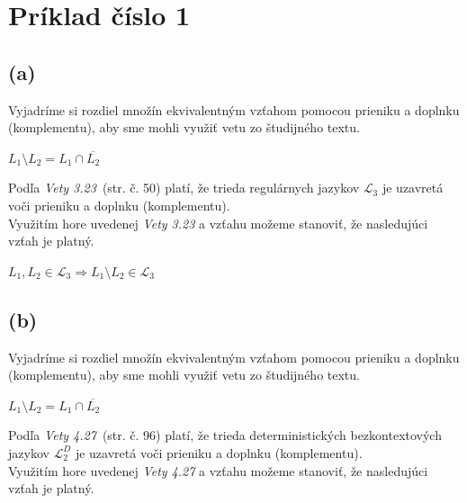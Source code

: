 \documentclass[11pt,a4paper]{article}
\begin{document}
\newpage

\section{Príklad číslo 1} %

\subsection{(a)} %

Vyjadríme si rozdiel množín ekvivalentným vzťahom pomocou prieniku a doplnku (komplementu), aby sme mohli využiť vetu zo študijného textu.
\begin{center}
$L_1 \setminus L_2 = L_1 \cap \overline{L_2}$
\end{center}

Podľa \textit{Vety 3.23}~\cite{TIN}(str. č. 50) platí, že trieda regulárnych jazykov $\mathcal{L}_3$ je uzavretá voči prieniku a doplnku (komplementu).\\

Využitím hore uvedenej \textit{Vety 3.23} a vzťahu možeme stanoviť, že nasledujúci vzťah je platný.

\begin{center}
$L_1,L_2 \in \mathcal{L}_3 \Rightarrow L_1 \setminus L_2 \in \mathcal{L}_3$
\end{center}

\subsection{(b)} %

Vyjadríme si rozdiel množín ekvivalentným vzťahom pomocou prieniku a doplnku (komplementu), aby sme mohli využiť vetu zo študijného textu.
\begin{center}
$L_1 \setminus L_2 = L_1 \cap \overline{L_2}$
\end{center}

Podľa \textit{Vety 4.27}~\cite{TIN}(str. č. 96) platí, že trieda deterministických bezkontextových jazykov $\mathcal{L}_2^D$ je uzavretá voči prieniku a doplnku (komplementu).\\

Využitím hore uvedenej \textit{Vety 4.27} a vzťahu možeme stanoviť, že nasledujúci vzťah je platný.
\end{document}
